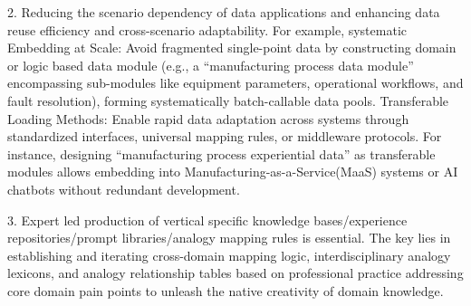 2. Reducing the scenario dependency of data applications and enhancing data reuse efficiency and cross-scenario adaptability. For example, systematic Embedding at Scale: Avoid fragmented single-point data by constructing domain or logic based data module (e.g., a ``manufacturing process data module'' encompassing sub-modules like equipment parameters, operational workflows, and fault resolution), forming systematically batch-callable data pools. Transferable Loading Methods: Enable rapid data adaptation across systems through standardized interfaces, universal mapping rules, or middleware protocols. For instance, designing ``manufacturing process experiential data'' as transferable modules allows embedding into Manufacturing-as-a-Service(MaaS)\cite{zhong2017intelligent} systems or AI chatbots without redundant development. 

3. Expert led production of vertical specific knowledge bases/experience repositories/prompt libraries/analogy mapping rules is essential\cite{gentner1983structure, moreno2016overcoming}. The key lies in establishing and iterating cross-domain mapping logic, interdisciplinary analogy lexicons, and analogy relationship tables\cite{cao2025medai} based on professional practice addressing core domain pain points to unleash the native creativity of domain knowledge.

